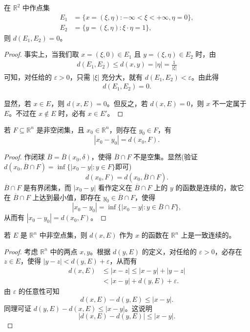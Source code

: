 \documentclass[../../main.tex]{subfiles}%
\begin{document}
\begin{example}
在 \(\mathbb{R}^2\) 中作点集
\begin{align*}
E_1 &= \{x = (\xi,\eta): -\infty < \xi < +\infty, \eta = 0\},\\
E_2 &= \{y = (\xi,\eta): \xi\cdot\eta = 1\},
\end{align*}
则 \(d(E_1,E_2) = 0\)。
\end{example}
\begin{proof}

事实上，当我们取 \(x = (\xi,0)\in E_1\) 且 \(y = (\xi,\eta)\in E_2\) 时，由
\begin{align*}
d(E_1,E_2) \leqslant d(x,y) = |\eta| = \frac{1}{|\xi|}
\end{align*}
可知，对任给的 \(\varepsilon > 0\)，只需 \(|\xi|\) 充分大，就有 \(d(E_1,E_2) < \varepsilon\)。由此得
\begin{align*}
d(E_1,E_2) = 0.
\end{align*}

显然，若 \(x\in E\)，则 \(d(x,E) = 0\)。但反之，若 \(d(x,E) = 0\)，则 \(x\) 不一定属于 \(E\)。不过在 \(x\notin E\) 时，必有 \(x\in E'\)。 

\end{proof}

\begin{theorem}\label{theorem:非空闭集关于点集之间距离的基本定理}
若 \(F\subseteq\mathbb{R}^n\) 是非空闭集，且 \(x_0\in\mathbb{R}^n\)，则存在 \(y_0\in F\)，有
\[
|x_0 - y_0| = d(x_0,F).
\]
\end{theorem}
\begin{proof}

作闭球 \(\overline{B}=\overline{B}(x_0,\delta)\)，使得 \(\overline{B}\cap F\) 不是空集。显然(验证$d(x_0,\overline{B}\cap F)=\inf\{|x_0-y|:y\in F\}$即可)
\[
d(x_0,F)=d(x_0,\overline{B}\cap F).
\]
\(\overline{B}\cap F\) 是有界闭集，而 \(|x_0 - y|\) 看作定义在 \(\overline{B}\cap F\) 上的 \(y\) 的函数是连续的，故它在 \(\overline{B}\cap F\) 上达到最小值，即存在 \(y_0\in\overline{B}\cap F\)，使得
\[
|x_0 - y_0| = \inf\{|x_0 - y|: y\in\overline{B}\cap F\},
\]
从而有 \(|x_0 - y_0| = d(x_0,F)\)。

\end{proof}

\begin{theorem}
若 \(E\) 是 \(\mathbb{R}^n\) 中非空点集，则 \(d(x,E)\) 作为 \(x\) 的函数在 \(\mathbb{R}^n\) 上是一致连续的。
\end{theorem}
\begin{proof}

考虑 \(\mathbb{R}^n\) 中的两点 \(x,y\)。根据 \(d(y,E)\) 的定义，对任给的 \(\varepsilon>0\)，必存在 \(z\in E\)，使得 \(|y - z|<d(y,E)+\varepsilon\)，从而有
\begin{align*}
d(x,E)&\leqslant|x - z|\leqslant|x - y|+|y - z|\\
&<|x - y|+d(y,E)+\varepsilon.
\end{align*}
由 \(\varepsilon\) 的任意性可知
\[
d(x,E)-d(y,E)\leqslant|x - y|.
\]
同理可证 \(d(y,E)-d(x,E)\leqslant|x - y|\)。这说明
\[
|d(x,E)-d(y,E)|\leqslant|x - y|.
\]

\end{proof}
\end{document}
